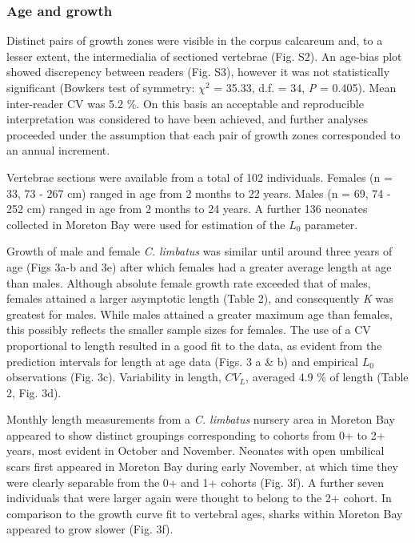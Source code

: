 \documentclass[]{article}
\begin{document}
\hypertarget{age-and-growth}{%
\subsubsection{Age and growth}\label{age-and-growth}}

Distinct pairs of growth zones were visible in the corpus calcareum and,
to a lesser extent, the intermedialia of sectioned vertebrae (Fig. S2).
An age-bias plot showed discrepency between readers (Fig. S3), however
it was not statistically significant (Bowkers test of symmetry:
\(\chi^2\) = 35.33, d.f. = 34, \emph{P} = 0.405). Mean inter-reader CV
was 5.2 \%. On this basis an acceptable and reproducible interpretation
was considered to have been achieved, and further analyses proceeded
under the assumption that each pair of growth zones corresponded to an
annual increment.

Vertebrae sections were available from a total of 102 individuals.
Females (n = 33, 73 - 267 cm) ranged in age from 2 months to 22 years.
Males (n = 69, 74 - 252 cm) ranged in age from 2 months to 24 years. A
further 136 neonates collected in Moreton Bay were used for estimation
of the \(L_0\) parameter.

Growth of male and female \emph{C. limbatus} was similar until around
three years of age (Figs 3a-b and 3e) after which females had a greater
average length at age than males. Although absolute female growth rate
exceeded that of males, females attained a larger asymptotic length
(Table 2), and consequently \emph{K} was greatest for males. While males
attained a greater maximum age than females, this possibly reflects the
smaller sample sizes for females. The use of a CV proportional to length
resulted in a good fit to the data, as evident from the prediction
intervals for length at age data (Figs. 3 a \& b) and empirical \(L_0\)
observations (Fig. 3c). Variability in length, \(CV_L\), averaged 4.9 \%
of length (Table 2, Fig. 3d).

Monthly length measurements from a \emph{C. limbatus} nursery area in
Moreton Bay appeared to show distinct groupings corresponding to cohorts
from 0+ to 2+ years, most evident in October and November. Neonates with
open umbilical scars first appeared in Moreton Bay during early
November, at which time they were clearly separable from the 0+ and 1+
cohorts (Fig. 3f). A further seven individuals that were larger again
were thought to belong to the 2+ cohort. In comparison to the growth
curve fit to vertebral ages, sharks within Moreton Bay appeared to grow
slower (Fig. 3f).
\end{document}
